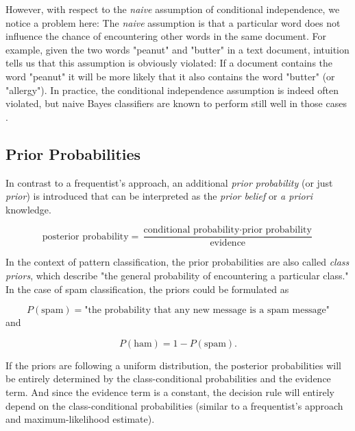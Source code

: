 \documentclass{article}
\begin{document}
However, with respect to the \emph{naive} assumption of conditional independence, we notice a problem here: The \emph{naive} assumption is that a particular word does not influence the chance of encountering other words in the same document. For example, given the two words  "peanut" and "butter" in a text document, intuition tells us that this assumption is obviously violated: If a document contains the word "peanut" it will be more likely that it also contains the word "butter" (or "allergy"). In practice, the conditional independence assumption is indeed often violated, but naive Bayes classifiers are known to perform still well in those cases \cite{zhang2004optimality}.



\subsection{Prior Probabilities}
\label{sec:prior_probabilities_1}

In contrast to a frequentist's approach, an additional \emph{prior probability} (or just \emph{prior}) is introduced that can be interpreted as the \emph{prior belief} or \emph{a priori} knowledge.

\begin{equation} \text{posterior probability} = \frac{\text{conditional probability} \cdot \text{prior probability}}{\text{evidence}} \end{equation}

In the context of pattern classification, the prior probabilities are also called \emph{class priors}, which describe "the general probability of encountering a particular class." In the case of spam classification, the priors could be formulated as 

\begin{equation}P(\text{spam})=\text{"the probability that any new message is a spam message"} \end{equation} and 

\begin{equation} P(\text{ham})= 1-P(\text{spam}). \end{equation}

If the priors are following a uniform distribution, the posterior probabilities will be entirely determined by the class-conditional probabilities and the evidence term. And since the evidence term is a constant, the decision rule will entirely depend on the class-conditional probabilities (similar to a frequentist's approach and maximum-likelihood estimate).
\end{document}

